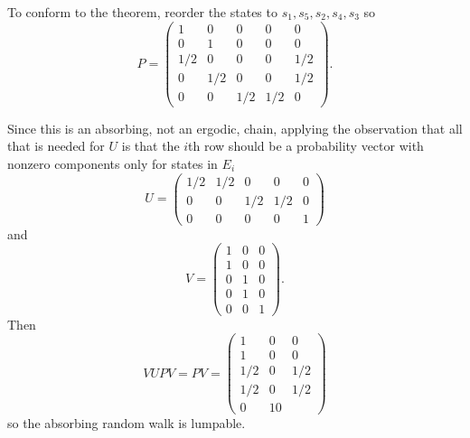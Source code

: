 \documentclass[12pt]{article}
\begin{document}
\begin{solution}
    To conform to the theorem, reorder the states to \( s_1, s_5, s_2, s_4,
    s_3 \) so
    \[
        P =
        \begin{pmatrix}
            1 & 0 & 0 & 0 & 0\\
            0 & 1 & 0 & 0 & 0\\
            1/2 & 0 & 0 & 0 & 1/2\\
            0 & 1/2 & 0 & 0 & 1/2\\
            0 & 0 & 1/2 & 1/2 & 0
        \end{pmatrix}
        .
    \]

    Since this is an absorbing, not an ergodic, chain, applying the
    observation that all that is needed for \( U \) is that the \( i \)th
    row should be a probability vector with nonzero components only for
    states in \( E_i \)
    \[
        U =
        \begin{pmatrix}
            1/2 & 1/2 & 0 & 0 & 0 \\
            0 & 0 & 1/2 & 1/2 & 0 \\
            0 & 0 & 0 & 0 & 1
        \end{pmatrix}
    \] and
    \[
        V =
        \begin{pmatrix}
            1 & 0 & 0 \\
            1 & 0 & 0 \\
            0 & 1 & 0 \\
            0 & 1 & 0 \\
            0 & 0 & 1
        \end{pmatrix}
        .
    \] Then
    \[
        VUPV = PV =
        \begin{pmatrix}
            1 & 0 & 0 \\
            1 & 0 & 0 \\
            1/2 & 0 & 1/2 \\
            1/2 & 0 & 1/2 \\
            0 & 1 0
        \end{pmatrix}
    \] so the absorbing random walk is lumpable.


\end{solution}
\end{document}
